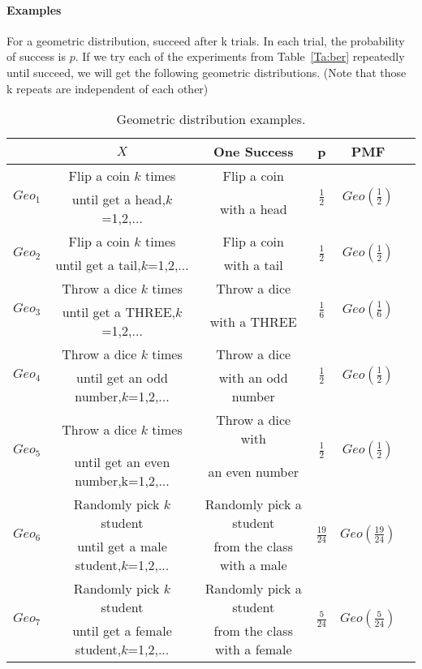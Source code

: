 \documentclass{article} %
\begin{document}
\paragraph*{Examples} For a geometric distribution, succeed after k trials. In each trial, the probability of success is $p$. If we try each of the experiments from Table~\ref{Ta:ber} repeatedly until succeed, we will get the following geometric distributions. (Note that those k repeats are independent of each other)
\begin{table}[h!]
\begin{center}
\renewcommand{\arraystretch}{1.5}
\begin{tabular}{|c|c|c|c|c|c|} \hline
& $X$ & One Success & p & PMF \\ \hline
\multirow{2}{*}{$Geo_1$} & {Flip a coin $k$ times} & {Flip a coin} & \multirow{2}{*}{$\frac{1}{2}$} & \multirow{2}{*}{$Geo(\frac{1}{2})$} \\
& until get a head,$k$=1,2,... & with a head  & & \\  \hline
\multirow{2}{*}{$Geo_2$} & {Flip a coin $k$ times} & {Flip a coin} & \multirow{2}{*}{$\frac{1}{2}$} & \multirow{2}{*}{$Geo(\frac{1}{2})$} \\
& until get a tail,$k$=1,2,... & with a tail &  & \\ \hline
\multirow{2}{*}{$Geo_3$} & {Throw a dice $k$ times} & {Throw a dice} & \multirow{2}{*}{$\frac{1}{6}$} & \multirow{2}{*}{$Geo(\frac{1}{6})$} \\
&  until get a THREE,$k$=1,2,... &  with a THREE &  & \\ \hline
\multirow{2}{*}{$Geo_4$} & {Throw a dice $k$ times}  & {Throw a dice} &  \multirow{2}{*}{$\frac{1}{2}$} & \multirow{2}{*}{$Geo(\frac{1}{2})$} \\
& until get an odd number,$k$=1,2,... &  with an odd number  &  & \\ \hline
\multirow{2}{*}{$Geo_5$} & {Throw a dice $k$ times} & {Throw a dice with}  & \multirow{2}{*}{$\frac{1}{2}$} & \multirow{2}{*}{$Geo(\frac{1}{2})$} \\
& until get an even number,k=1,2,... & an even number & & \\ \hline
\multirow{2}{*}{$Geo_6$} & {Randomly pick $k$ student} &{Randomly pick a student}&  \multirow{2}{*}{$\frac{19}{24}$} & \multirow{2}{*}{$Geo(\frac{19}{24})$} \\
& until get a male student,$k$=1,2,... &  from the class with a male  & & \\ \hline
\multirow{2}{*}{$Geo_7$} &{Randomly pick $k$ student}  & {Randomly pick a student}& \multirow{2}{*}{$\frac{5}{24}$} & \multirow{2}{*}{$Geo(\frac{5}{24})$} \\
& until get a female student,$k$=1,2,... &  from the class with a female  & & \\
\hline
\end{tabular}
\caption{Geometric distribution examples.}
\label{Ta:geo}
\end{center}
\end{table}
\end{document}
